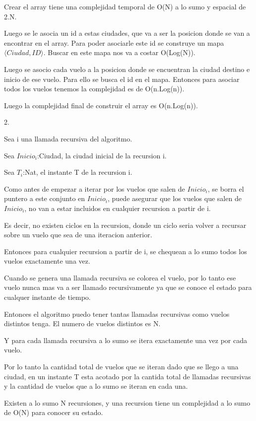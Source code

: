 Crear el array tiene una complejidad temporal de O(N) a lo sumo y espacial de 2.N.

Luego se le asocia un id a estas ciudades, que va a ser la posicion donde se van a encontrar en el array. Para poder asociarle este id se construye un mapa $\langle Ciudad,ID \rangle$.
Buscar en este mapa nos va a costar O(Log(N)).

Luego se asocio cada vuelo a la posicion donde se encuentran la ciudad destino e inicio de ese vuelo.
Para ello se busca el id en el mapa. Entonces para asociar todos los vuelos tenemos la complejidad es de O(n.Log(n)).

Luego la complejidad final de construir el array es O(n.Log(n)).

2.

Sea i una llamada recursiva del algoritmo.

Sea $Inicio_{i}$:Ciudad, la ciudad inicial de la recursion i.

Sea $T_{i}$:Nat, el instante T de la recursion i.

Como antes de empezar a iterar por los vuelos que salen de $Inicio_{i}$, se borra el puntero a este conjunto en $Inicio_{i}$, puede asegurar que los vuelos que salen de $Inicio_{i}$, no van a estar incluidos en cualquier recursion a partir de i.

Es decir, no existen ciclos en la recursion, donde un ciclo seria volver a recursar sobre un vuelo que sea de una iteracion anterior.

Entonces para cualquier recursion a partir de i, se chequean a lo sumo todos los vuelos exactamente una vez.

Cuando se genera una llamada recursiva se colorea el vuelo, por lo tanto ese vuelo nunca mas va a ser llamado recursivamente ya que se conoce el estado para cualquer instante de tiempo.

Entonces el algoritmo puedo tener tantas llamadas recursivas como vuelos distintos tenga.
El numero de vuelos distintos es N.

Y para cada llamada recursiva a lo sumo se itera exactamente una vez por cada vuelo.

Por lo tanto la cantidad total de vuelos que se iteran dado que se llego a una ciudad, en un instante T esta acotado por la cantida total de llamadas recursivas y la cantidad de vuelos que a lo sumo se iteran en cada una.

Existen a lo sumo N recursiones, y una recursion tiene un complejidad a lo sumo de O(N) para conocer su estado.

